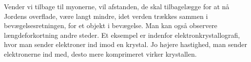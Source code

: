 Vender vi tilbage til myonerne, vil afstanden, de skal tilbagelægge for at nå Jordens overflade, være langt mindre, idet verden trækkes sammen i bevægelsesretningen, for et objekt i bevægelse.
Man kan også observere længdeforkortning andre steder. Et eksempel er indenfor elektronkrystallografi, hvor man sender elektroner ind imod en krystal. Jo højere hastighed, man sender elektronerne ind med, desto mere komprimeret virker krystallen.